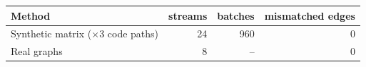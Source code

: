 \begin{tabular}{lrrr}
\toprule
Method & streams & batches & mismatched edges \\
\midrule
Synthetic matrix ($\times$3 code paths) & 24 & 960 & 0 \\
Real graphs & 8 & -- & 0 \\
\bottomrule
\end{tabular}
